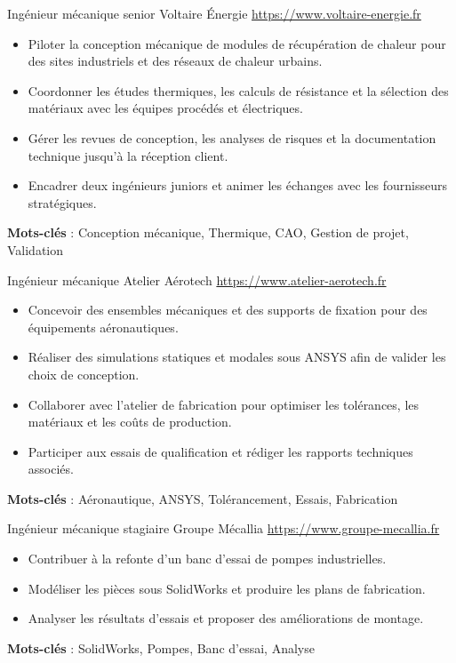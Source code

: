\documentclass[a4paper, serif, 10pt]{moderncv}
\begin{document}
        {Ingénieur mécanique senior}
        {Voltaire Énergie}
        {\url{https://www.voltaire-energie.fr}}
        {}
        {\begin{itemize}
\item Piloter la conception mécanique de modules de récupération de chaleur pour des sites industriels et des réseaux de chaleur urbains.
\item Coordonner les études thermiques, les calculs de résistance et la sélection des matériaux avec les équipes procédés et électriques.
\item Gérer les revues de conception, les analyses de risques et la documentation technique jusqu'à la réception client.
\item Encadrer deux ingénieurs juniors et animer les échanges avec les fournisseurs stratégiques.
\end{itemize}
\textbf{Mots-clés} : Conception mécanique, Thermique, CAO, Gestion de projet, Validation}

        {Ingénieur mécanique}
        {Atelier Aérotech}
        {\url{https://www.atelier-aerotech.fr}}
        {}
        {\begin{itemize}
\item Concevoir des ensembles mécaniques et des supports de fixation pour des équipements aéronautiques.
\item Réaliser des simulations statiques et modales sous ANSYS afin de valider les choix de conception.
\item Collaborer avec l'atelier de fabrication pour optimiser les tolérances, les matériaux et les coûts de production.
\item Participer aux essais de qualification et rédiger les rapports techniques associés.
\end{itemize}
\textbf{Mots-clés} : Aéronautique, ANSYS, Tolérancement, Essais, Fabrication}

        {Ingénieur mécanique stagiaire}
        {Groupe Mécallia}
        {\url{https://www.groupe-mecallia.fr}}
        {}
        {\begin{itemize}
\item Contribuer à la refonte d'un banc d'essai de pompes industrielles.
\item Modéliser les pièces sous SolidWorks et produire les plans de fabrication.
\item Analyser les résultats d'essais et proposer des améliorations de montage.
\end{itemize}
\textbf{Mots-clés} : SolidWorks, Pompes, Banc d'essai, Analyse}
\end{document}
